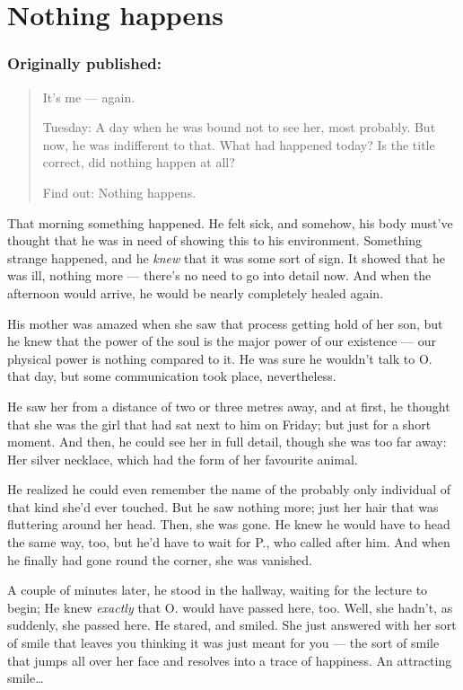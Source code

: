 \chapter{Nothing happens}
\label{cha:nothing-happens}
\subsection*{Originally published: }
\begin{quote}
It's me --- again. 

Tuesday: A day when he was bound not to see her, most probably. 
But now, he was indifferent to that. 
What had happened today?
Is the title correct, did nothing happen at all?

Find out: Nothing happens.
\end{quote}

That morning something happened. 
He felt sick, and somehow, his body must've thought that he was in need of showing this to his environment. Something strange happened, and he \emph{knew} that it was some sort of sign. 
It showed that he was ill, nothing more --- there's no need to go into detail now. 
And when the afternoon would arrive, he would be nearly completely healed again.

His mother was amazed when she saw that process getting hold of her son, but he knew that the power of the soul is the major power of our existence --- our physical power is nothing compared to it. 
He was sure he wouldn't talk to O. that day, but some communication took place, nevertheless.

He saw her from a distance of two or three metres away, and at first, he thought that she was the girl that had sat next to him on Friday; but just for a short moment. And then, he could see her in full detail, though she was too far away: Her silver necklace, which had the form of her favourite animal.

He realized he could even remember the name of the probably only individual of that kind she'd ever touched. 
But he saw nothing more; just her hair that was fluttering around her head. Then, she was gone. He knew he would have to head the same way, too, but he'd have to wait for P., who called after him. And when he finally had gone round the corner, she was vanished.

A couple of minutes later, he stood in the hallway, waiting for the lecture to begin; He knew \emph{exactly} that O. would have passed here, too. 
Well, she hadn't, as suddenly, she passed here. He stared, and smiled. She just answered with her sort of smile that leaves you thinking it was just meant for you --- the sort of smile that jumps all over her face and resolves into a trace of happiness. 
An attracting smile\dots{}

